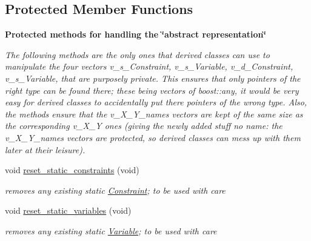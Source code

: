 \subsection*{Protected Member Functions}
\begin{Indent}\textbf{ Protected methods for handling the \char`\"{}abstract representation\char`\"{}}\par
{\em The following methods are the only ones that derived classes can use to manipulate the four vectors v\+\_\+s\+\_\+\+Constraint, v\+\_\+s\+\_\+\+Variable, v\+\_\+d\+\_\+\+Constraint, v\+\_\+s\+\_\+\+Variable, that are purposely {\itshape private}. This ensures that only pointers of the right type can be found there; these being vectors of boost\+::any, it would be very easy for derived classes to accidentally put there pointers of the wrong type. Also, the methods ensure that the v\+\_\+\+X\+\_\+\+Y\+\_\+names vectors are kept of the same size as the corresponding v\+\_\+\+X\+\_\+Y ones (giving the newly added stuff no name\+: the v\+\_\+\+X\+\_\+\+Y\+\_\+names vectors are protected, so derived classes can mess up with them later at their leisure). }\begin{DoxyCompactItemize}
\item 
\mbox{\label{class_s_m_spp__di__unipi__it_1_1_block_a9e42f7f19c1e96b86ab3978d86ab9c0f}} 
void \mbox{\hyperlink{class_s_m_spp__di__unipi__it_1_1_block_a9e42f7f19c1e96b86ab3978d86ab9c0f}{reset\+\_\+static\+\_\+constraints}} (void)
\begin{DoxyCompactList}\small\item\em removes any existing static \mbox{\hyperlink{class_s_m_spp__di__unipi__it_1_1_constraint}{Constraint}}; to be used with care \end{DoxyCompactList}\item 
\mbox{\label{class_s_m_spp__di__unipi__it_1_1_block_a781c3d6c33ec9749be86257c21193c01}} 
void \mbox{\hyperlink{class_s_m_spp__di__unipi__it_1_1_block_a781c3d6c33ec9749be86257c21193c01}{reset\+\_\+static\+\_\+variables}} (void)
\begin{DoxyCompactList}\small\item\em removes any existing static \mbox{\hyperlink{class_s_m_spp__di__unipi__it_1_1_variable}{Variable}}; to be used with care \end{DoxyCompactList}\item 
\mbox{\label{class_s_m_spp__di__unipi__it_1_1_block_a92e3c32bebdfb05e119f05f1030dc11a}} 

\end{DoxyCompactItemize}
\end{Indent}
